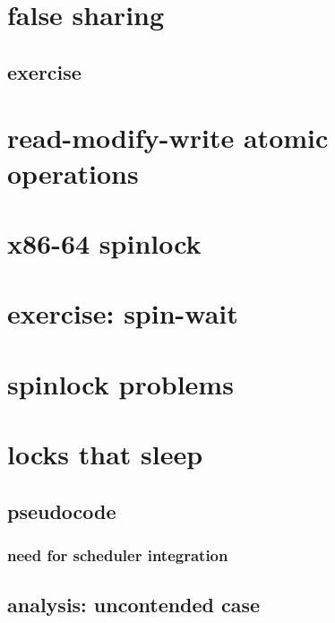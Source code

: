 \section{false sharing}


\subsection{exercise}


\section{read-modify-write atomic operations}


\section{x86-64 spinlock}


\section{exercise: spin-wait}


\section{spinlock problems}


\section{locks that sleep}



\subsection{pseudocode}


\subsubsection{need for scheduler integration}


\subsection{analysis: uncontended case}


